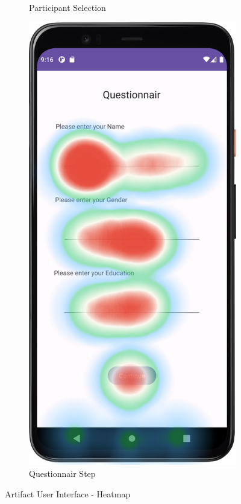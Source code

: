 \begin{figure}[htbp]
\begin{subfigure}[b]{0.25\textwidth}
        \caption{Participant Selection}
        \label{subfig:heatmapB}
    \end{subfigure}
        \hspace{1cm}
    \begin{subfigure}[b]{0.25\textwidth}
        \centering
        \includegraphics[width=\textwidth]{content/07_evaluation_of_the_solution/HeatMap_QuestionnairScreen.png}
        \caption{Questionnair Step}
        \label{subfig:heatmapC}
    \end{subfigure}
       \caption{Artifact User Interface - Heatmap}
       \label{fig:heatmaps}
\end{figure}


